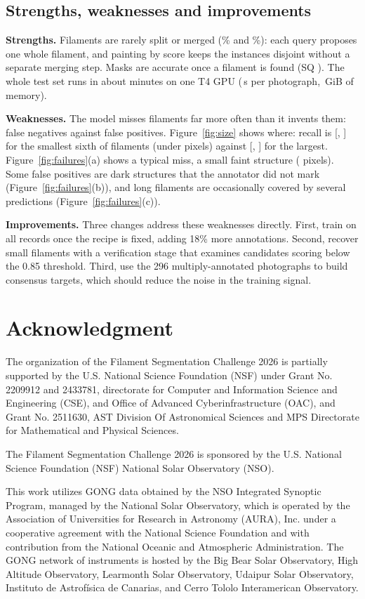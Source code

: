 \documentclass[sigconf]{acmart}
\begin{document}
\subsection{Strengths, weaknesses and improvements}
\textbf{Strengths.} Filaments are rarely split or merged (\GTSplitPct{}\% and
\PredMergePct{}\%): each query proposes one whole filament, and painting by score
keeps the instances disjoint without a separate merging step. Masks are accurate once a
filament is found (SQ \ValSQ{}). The whole test set runs in about \TestMinutes{} minutes
on one T4 GPU (\SecondsPerPhoto{}\,s per photograph, \PeakGiB{}\,GiB of memory).

\textbf{Weaknesses.} The model misses filaments far more often than it invents them:
\NumFN{} false negatives against \NumFP{} false positives. Figure~\ref{fig:size} shows
where: recall is \RecallSmall{} [\RecallSmallLow{}, \RecallSmallHigh{}] for the
smallest sixth of filaments (under \SmallArea{} pixels) against \RecallLarge{}
[\RecallLargeLow{}, \RecallLargeHigh{}] for the largest. Figure~\ref{fig:failures}(a)
shows a typical miss, a small faint structure (\FailMissArea{} pixels). Some false
positives are dark structures that the annotator did not mark
(Figure~\ref{fig:failures}(b)), and long filaments are occasionally covered by several
predictions (Figure~\ref{fig:failures}(c)).

\textbf{Improvements.} Three changes address these weaknesses directly. First, train
on all \AllRecords{} records once the recipe is fixed, adding 18\% more annotations.
Second, recover small filaments with a verification stage that examines candidates
scoring below the 0.85 threshold. Third, use the 296 multiply-annotated photographs to
build consensus targets, which should reduce the noise in the training signal.

\FloatBarrier
\section{Acknowledgment}
The organization of the Filament Segmentation Challenge 2026 is partially supported by
the U.S. National Science Foundation (NSF) under Grant No. 2209912 and 2433781,
directorate for Computer and Information Science and Engineering (CSE), and Office of
Advanced Cyberinfrastructure (OAC), and Grant No. 2511630, AST Division Of Astronomical
Sciences and MPS Directorate for Mathematical and Physical Sciences.

The Filament Segmentation Challenge 2026 is sponsored by the U.S. National Science
Foundation (NSF) National Solar Observatory (NSO).

This work utilizes GONG data obtained by the NSO Integrated Synoptic Program, managed
by the National Solar Observatory, which is operated by the Association of Universities
for Research in Astronomy (AURA), Inc. under a cooperative agreement with the National
Science Foundation and with contribution from the National Oceanic and Atmospheric
Administration. The GONG network of instruments is hosted by the Big Bear Solar
Observatory, High Altitude Observatory, Learmonth Solar Observatory, Udaipur Solar
Observatory, Instituto de Astrofísica de Canarias, and Cerro Tololo Interamerican
Observatory.



\end{document}

